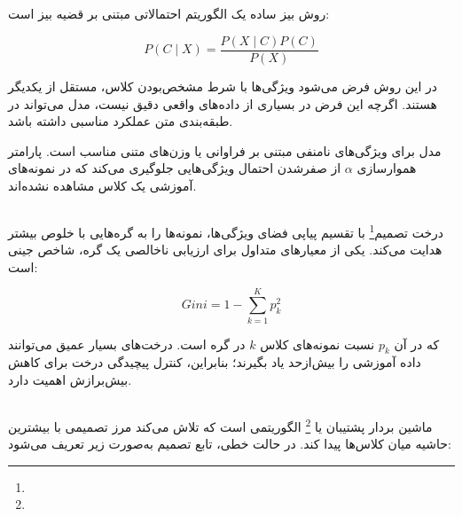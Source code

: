 \subsection{}

روش بیز ساده یک الگوریتم احتمالاتی مبتنی بر قضیه بیز است:

\begin{equation}
P(C\mid X)
=
\frac{
P(X\mid C)P(C)
}{
P(X)
}
\end{equation}

در این روش فرض می‌شود ویژگی‌ها با شرط مشخص‌بودن کلاس، مستقل از یکدیگر هستند. اگرچه این فرض در بسیاری از داده‌های واقعی دقیق نیست، مدل می‌تواند در طبقه‌بندی متن عملکرد مناسبی داشته باشد.

مدل
برای ویژگی‌های نامنفی مبتنی بر فراوانی یا وزن‌های متنی مناسب است. پارامتر هموارسازی $\alpha$ از صفرشدن احتمال ویژگی‌هایی جلوگیری می‌کند که در نمونه‌های آموزشی یک کلاس مشاهده نشده‌اند.


\subsection{}

درخت تصمیم\footnote{} با تقسیم پیاپی فضای ویژگی‌ها، نمونه‌ها را به گره‌هایی با خلوص بیشتر هدایت می‌کند. یکی از معیارهای متداول برای ارزیابی ناخالصی یک گره، شاخص جینی است:

\begin{equation}
Gini
=
1-
\sum_{k=1}^{K}p_k^2
\end{equation}

که در آن $p_k$ نسبت نمونه‌های کلاس $k$ در گره است. درخت‌های بسیار عمیق می‌توانند داده آموزشی را بیش‌ازحد یاد بگیرند؛ بنابراین، کنترل پیچیدگی درخت برای کاهش بیش‌برازش اهمیت دارد.


\subsection{}

ماشین بردار پشتیبان یا
\footnote{}
الگوریتمی است که تلاش می‌کند مرز تصمیمی با بیشترین حاشیه میان کلاس‌ها پیدا کند. در حالت خطی، تابع تصمیم به‌صورت زیر تعریف می‌شود:

